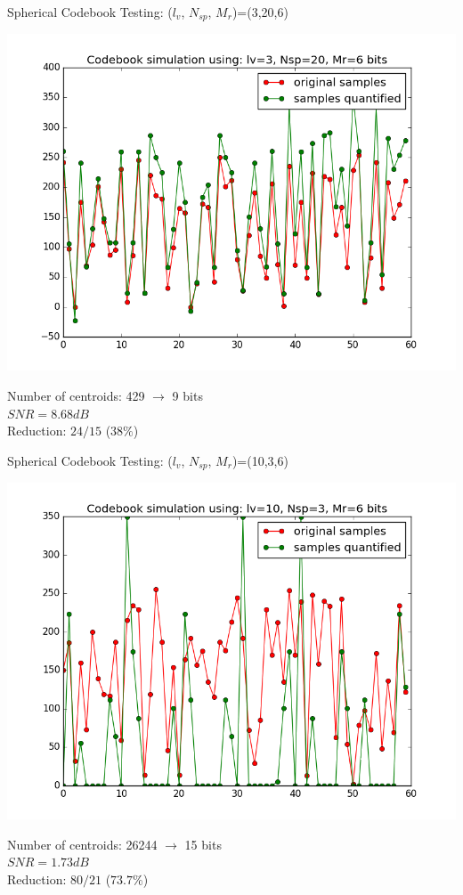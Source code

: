 \documentclass[10pt]{beamer}
\begin{document}
  \begin{frame}{Spherical Codebook Testing: ($l_v$, $N_{sp}$, $M_r$)=(3,20,6)}
    \begin{center}
    \includegraphics[width=0.8\linewidth]{./img/cb_3_20_6_r.png}\\
    \end{center}
    Number of centroids: 429 $\rightarrow$ 9 bits\\
    $SNR = 8.68 dB$\\
    Reduction: $24/15$ ($38\%$)
  \end{frame}

  \begin{frame}{Spherical Codebook Testing: ($l_v$, $N_{sp}$, $M_r$)=(10,3,6)}
    \begin{center}
    \includegraphics[width=0.8\linewidth]{./img/cb_10_3_6_r.png}\\
    \end{center}
    Number of centroids: 26244 $\rightarrow$ 15 bits\\
    $SNR = 1.73 dB$\\
    Reduction: $80/21$ ($73.7\%$)
  \end{frame}
\end{document}
